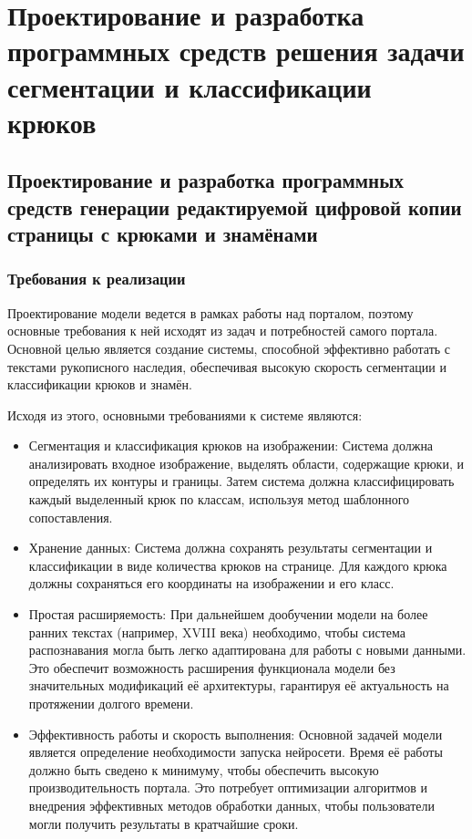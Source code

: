 \chapter{Проектирование и разработка программных средств решения задачи сегментации и классификации крюков}

\section{Проектирование и разработка программных средств генерации редактируемой цифровой копии страницы с крюками и знамёнами}

\subsection{Требования к реализации}

Проектирование модели ведется в рамках работы над порталом, поэтому основные требования к ней 
исходят из задач и потребностей самого портала. Основной целью является создание системы, 
способной эффективно работать с текстами рукописного наследия, обеспечивая высокую скорость 
сегментации и классификации крюков и знамён.

Исходя из этого, основными требованиями к системе являются\cite{MLeffinguel}:
\begin{itemize}
  \item Сегментация и классификация крюков на изображении: Система должна анализировать 
    входное изображение, выделять области, содержащие крюки, и определять их контуры и 
    границы. Затем система должна классифицировать каждый выделенный крюк по 
    классам, используя метод шаблонного сопоставления. 
  \item Хранение данных: Система должна сохранять результаты сегментации и классификации 
    в виде количества крюков на странице. Для каждого крюка должны сохраняться 
    его координаты на изображении и его класс.
  \item Простая расширяемость: При дальнейшем дообучении модели на более ранних текстах 
    (например, XVIII века) необходимо, чтобы система распознавания могла быть легко 
    адаптирована для работы с новыми данными. Это обеспечит возможность расширения 
    функционала модели без значительных модификаций её архитектуры, гарантируя её 
    актуальность на протяжении долгого времени.
  \item Эффективность работы и скорость выполнения: Основной задачей модели является определение необходимости 
    запуска нейросети. Время её работы должно быть сведено к минимуму, чтобы 
    обеспечить высокую производительность портала. Это потребует оптимизации 
    алгоритмов и внедрения эффективных методов обработки данных, чтобы 
    пользователи могли получить результаты в кратчайшие сроки.
\end{itemize}



